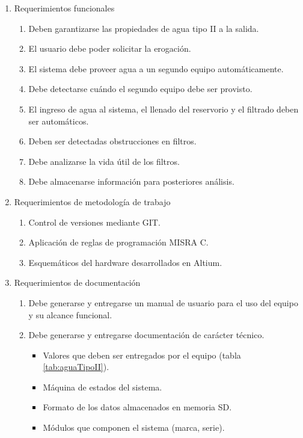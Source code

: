\documentclass[
11pt, %
]{charter}
\begin{document}
\begin{enumerate}
	\item Requerimientos funcionales
		\begin{enumerate}
			\item Deben garantizarse las propiedades de agua tipo II a la salida.
			\item El usuario debe poder solicitar la erogación.
			\item El sistema debe proveer agua a un segundo equipo automáticamente.
			\item Debe detectarse cuándo el segundo equipo debe ser provisto.
			\item El ingreso de agua al sistema, el llenado del reservorio y el filtrado deben ser automáticos.
			\item Deben ser detectadas obstrucciones en filtros.
			\item Debe analizarse la vida útil de los filtros.
			\item Debe almacenarse información para posteriores análisis.
		\end{enumerate}
	\item Requerimientos de metodología de trabajo
		\begin{enumerate}
			\item Control de versiones mediante GIT.
			\item Aplicación de reglas de programación MISRA C.
			\item Esquemáticos del hardware desarrollados en Altium.
		\end{enumerate}
	\item Requerimientos de documentación
		\begin{enumerate}
			\item Debe generarse y entregarse un manual de usuario para el uso del equipo y su alcance funcional.
			\item Debe generarse y entregarse documentación de carácter técnico.
			\begin{itemize}
				\item Valores que deben ser entregados por el equipo (tabla \ref{tab:aguaTipoII}).
				\item Máquina de estados del sistema.
				\item Formato de los datos almacenados en memoria SD.
				\item Módulos que componen el sistema (marca, serie).
			\end{itemize}
		\end{enumerate}
\end{enumerate}
\end{document}
